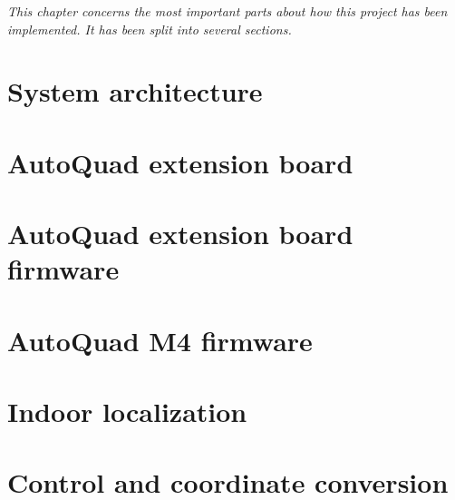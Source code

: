 \textit{This chapter concerns the most important parts about how this project has been implemented. It has been split into several sections.}

\section{System architecture}


\section{AutoQuad extension board} \label{sec:autoquad_extension_board}


\section{AutoQuad extension board firmware} \label{sec:extension_board_firmware}


\section{AutoQuad M4 firmware} \label{sec:aq_m4_firmware}


%

%






\section{Indoor localization} \label{sec:indoor_localization}


\section{Control and coordinate conversion}
\label{sec:control_and_coordinate_conversion}


